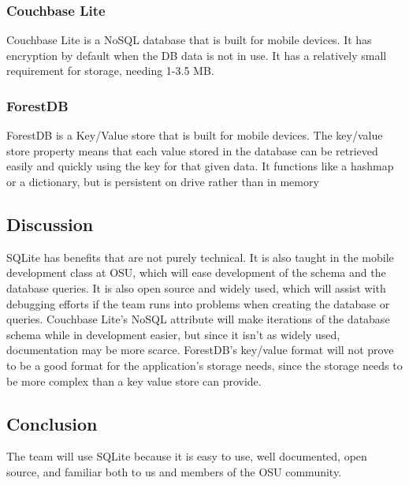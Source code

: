 \documentclass[onecolumn, draftclsnofoot,10pt, compsoc]{IEEEtran}
\begin{document}
\subsubsection{Couchbase Lite}
Couchbase Lite is a NoSQL database that is built for mobile devices. It has encryption by default when the DB data is not in use. It has a relatively small requirement for storage, needing 1-3.5 MB.
\subsubsection{ForestDB}
ForestDB is a Key/Value store that is built for mobile devices. The key/value store property means that each value stored in the database can be retrieved easily and quickly using the key for that given data. It functions like a hashmap or a dictionary, but is persistent on drive rather than in memory
\subsection{Discussion}
SQLite has benefits that are not purely technical. It is also taught in the mobile development class at OSU, which will ease development of the schema and the database queries. It is also open source and widely used, which will assist with debugging efforts if the team runs into problems when creating the database or queries. Couchbase Lite's NoSQL attribute will make iterations of the database schema while in development easier, but since it isn't as widely used, documentation may be more scarce. ForestDB's key/value format will not prove to be a good format for the application's storage needs, since the storage needs to be more complex than a key value store can provide.

\subsection{Conclusion}
The team will use SQLite because it is easy to use, well documented, open source, and familiar both to us and members of the OSU community.


\end{document}
